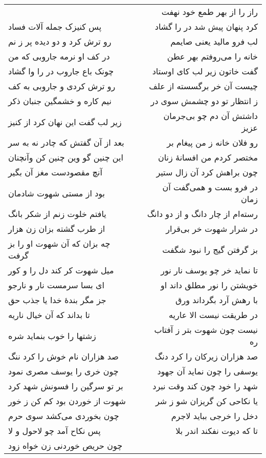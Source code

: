 \begin{center}
\begin{longtable}{l p{0.5cm} r}
&&
راز را از بهر طمع خود نهفت
\\
پس کنیزک جمله آلات فساد
&&
کرد پنهان پیش شد در را گشاد
\\
رو ترش کرد و دو دیده پر ز نم
&&
لب فرو مالید یعنی صایمم
\\
در کف او نرمه جاروبی که من
&&
خانه را می‌روفتم بهر عطن
\\
چونک باع جاروب در را وا گشاد
&&
گفت خاتون زیر لب کای اوستاد
\\
رو ترش کردی و جاروبی به کف
&&
چیست آن خر برگسسته از علف
\\
نیم کاره و خشمگین جنبان ذکر
&&
ز انتظار تو دو چشمش سوی در
\\
زیر لب گفت این نهان کرد از کنیز
&&
داشتش آن دم چو بی‌جرمان عزیز
\\
بعد از آن گفتش که چادر نه به سر
&&
رو فلان خانه ز من پیغام بر
\\
این چنین گو وین چنین کن وآنچنان
&&
مختصر کردم من افسانهٔ زنان
\\
آنچ مقصودست مغز آن بگیر
&&
چون براهش کرد آن زال ستیر
\\
بود از مستی شهوت شادمان
&&
در فرو بست و همی‌گفت آن زمان
\\
یافتم خلوت زنم از شکر بانگ
&&
رسته‌ام از چار دانگ و از دو دانگ
\\
از طرب گشته بزان زن هزار
&&
در شرار شهوت خر بی‌قرار
\\
چه بزان که آن شهوت او را بز گرفت
&&
بز گرفتن گیج را نبود شگفت
\\
میل شهوت کر کند دل را و کور
&&
تا نماید خر چو یوسف نار نور
\\
ای بسا سرمست نار و نارجو
&&
خویشتن را نور مطلق داند او
\\
جز مگر بندهٔ خدا یا جذب حق
&&
با رهش آرد بگرداند ورق
\\
تا بداند که آن خیال ناریه
&&
در طریقت نیست الا عاریه
\\
زشتها را خوب بنماید شره
&&
نیست چون شهوت بتر ز آفتاب ره
\\
صد هزاران نام خوش را کرد ننگ
&&
صد هزاران زیرکان را کرد دنگ
\\
چون خری را یوسف مصری نمود
&&
یوسفی را چون نماید آن جهود
\\
بر تو سرگین را فسونش شهد کرد
&&
شهد را خود چون کند وقت نبرد
\\
شهوت از خوردن بود کم کن ز خور
&&
یا نکاحی کن گریزان شو ز شر
\\
چون بخوردی می‌کشد سوی حرم
&&
دخل را خرجی بباید لاجرم
\\
پس نکاح آمد چو لاحول و لا
&&
تا که دیوت نفکند اندر بلا
\\
چون حریص خوردنی زن خواه زود

\end{longtable}
\end{center}
